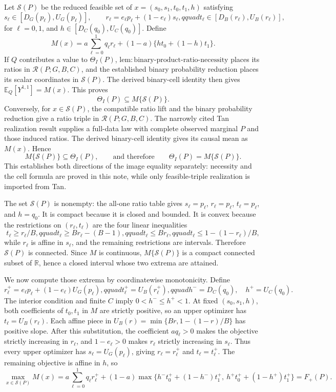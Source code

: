 Let \(\mathcal S(P)\) be the reduced feasible set of \(x=(s_0,s_1,t_0,t_1,h)\) satisfying
\[
s_\ell\in[D_G(p_\ell),U_G(p_\ell)],\qquad
r_\ell=e_\ell p_\ell+(1-e_\ell)s_\ell,qquad
t_\ell\in[D_B(r_\ell),U_B(r_\ell)],
\]
for \(\ell=0,1\), and \(h\in[D_C(q_0),U_C(q_0)]\). Define
\[
M(x)=a\sum_{\ell=0}^1q_\ell r_\ell+(1-a)\{h t_0+(1-h)t_1\}.
\]
If \(Q\) contributes a value to \(\Theta_I(P)\), \(\mathrm{lem{:}binary\text{-}product\text{-}ratio\text{-}necessity}\) places its ratios in \(\mathcal R(P;G,B,C)\), and the established binary probability reduction places its scalar coordinates in \(\mathcal S(P)\). The derived binary-cell identity then gives \(\mathbb E_Q[Y^{1,1}]=M(x)\). This proves
\[
\Theta_I(P)\subseteq M\{\mathcal S(P)\}.
\]
Conversely, for \(x\in\mathcal S(P)\), the compatible ratio lift and the binary probability reduction give a ratio triple in \(\mathcal R(P;G,B,C)\). The narrowly cited Tan realization result supplies a full-data law with complete observed marginal \(P\) and those induced ratios. The derived binary-cell identity gives its causal mean as \(M(x)\). Hence
\[
M\{\mathcal S(P)\}\subseteq\Theta_I(P),
\qquad\text{and therefore}\qquad
\Theta_I(P)=M\{\mathcal S(P)\}.
\]
This establishes both directions of the image equality separately: necessity and the cell formula are proved in this note, while only feasible-triple realization is imported from Tan.

The set \(\mathcal S(P)\) is nonempty: the all-one ratio table gives \(s_\ell=p_\ell\), \(r_\ell=p_\ell\), \(t_\ell=p_\ell\), and \(h=q_0\). It is compact because it is closed and bounded. It is convex because the restrictions on \((r_\ell,t_\ell)\) are the four linear inequalities
\[
t_\ell\geq r_\ell/B,qquad
t_\ell\geq Br_\ell-(B-1),qquad
t_\ell\leq Br_\ell,qquad
t_\ell\leq1-(1-r_\ell)/B,
\]
while \(r_\ell\) is affine in \(s_\ell\), and the remaining restrictions are intervals. Therefore \(\mathcal S(P)\) is connected. Since \(M\) is continuous, \(M\{\mathcal S(P)\}\) is a compact connected subset of \(\mathbb R\), hence a closed interval whose two extrema are attained.

We now compute those extrema by coordinatewise monotonicity. Define
\[
r_\ell^+=e_\ell p_\ell+(1-e_\ell)U_G(p_\ell),qquad
t_\ell^+=U_B(r_\ell^+),qquad
h^-=D_C(q_0),\quad h^+=U_C(q_0).
\]
The interior condition and finite \(C\) imply \(0<h^-\leq h^+<1\). At fixed \((s_0,s_1,h)\), both coefficients of \(t_0,t_1\) in \(M\) are strictly positive, so an upper optimizer has \(t_\ell=U_B(r_\ell)\). Each affine piece in \(U_B(r)=\min\{Br,1-(1-r)/B\}\) has positive slope. After this substitution, the coefficient \(a q_\ell>0\) makes the objective strictly increasing in \(r_\ell\), and \(1-e_\ell>0\) makes \(r_\ell\) strictly increasing in \(s_\ell\). Thus every upper optimizer has \(s_\ell=U_G(p_\ell)\), giving \(r_\ell=r_\ell^+\) and \(t_\ell=t_\ell^+\). The remaining objective is affine in \(h\), so
\[
\max_{x\in\mathcal S(P)}M(x)
=a\sum_{\ell=0}^1q_\ell r_\ell^+
 +(1-a)\max\{h^-t_0^++(1-h^-)t_1^+,\ h^+t_0^++(1-h^+)t_1^+\}
=F_+(P).
\]

